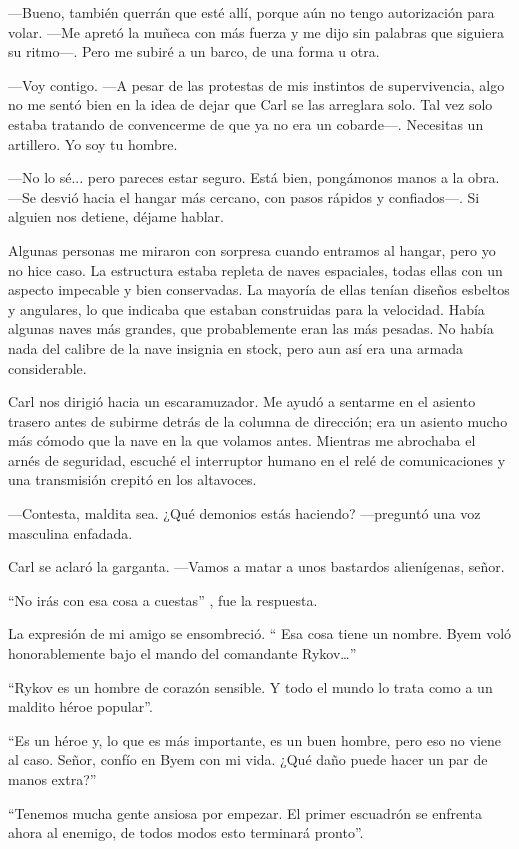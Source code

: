 —Bueno, también querrán que esté allí, porque aún no tengo autorización para volar. —Me apretó la muñeca con más fuerza y me dijo sin palabras que siguiera su ritmo—. Pero me subiré a un barco, de una forma u otra.

—Voy contigo. —A pesar de las protestas de mis instintos de supervivencia, algo no me sentó bien en la idea de dejar que Carl se las arreglara solo. Tal vez solo estaba tratando de convencerme de que ya no era un cobarde—. Necesitas un artillero. Yo soy tu hombre.

—No lo sé... pero pareces estar seguro. Está bien, pongámonos manos a la obra. —Se desvió hacia el hangar más cercano, con pasos rápidos y confiados—. Si alguien nos detiene, déjame hablar.

Algunas personas me miraron con sorpresa cuando entramos al hangar, pero yo no hice caso. La estructura estaba repleta de naves espaciales, todas ellas con un aspecto impecable y bien conservadas. La mayoría de ellas tenían diseños esbeltos y angulares, lo que indicaba que estaban construidas para la velocidad. Había algunas naves más grandes, que probablemente eran las más pesadas. No había nada del calibre de la nave insignia en stock, pero aun así era una armada considerable.

Carl nos dirigió hacia un escaramuzador. Me ayudó a sentarme en el asiento trasero antes de subirme detrás de la columna de dirección; era un asiento mucho más cómodo que la nave en la que volamos antes. Mientras me abrochaba el arnés de seguridad, escuché el interruptor humano en el relé de comunicaciones y una transmisión crepitó en los altavoces.

—Contesta, maldita sea. ¿Qué demonios estás haciendo? —preguntó una voz masculina enfadada.

Carl se aclaró la garganta. —Vamos a matar a unos bastardos alienígenas, señor.

``No irás con esa cosa a cuestas''
, fue la respuesta.

La expresión de mi amigo se ensombreció. `` Esa cosa tiene un nombre. Byem voló honorablemente bajo el mando del comandante Rykov…''


``Rykov es un hombre de corazón sensible. Y todo el mundo lo trata como a un maldito héroe popular''.

``Es un héroe y, lo que es más importante, es un buen hombre, pero eso no viene al caso. Señor, confío en Byem con mi vida. ¿Qué daño puede hacer un par de manos extra?''


``Tenemos mucha gente ansiosa por empezar. El primer escuadrón se enfrenta ahora al enemigo, de todos modos esto terminará pronto''.

